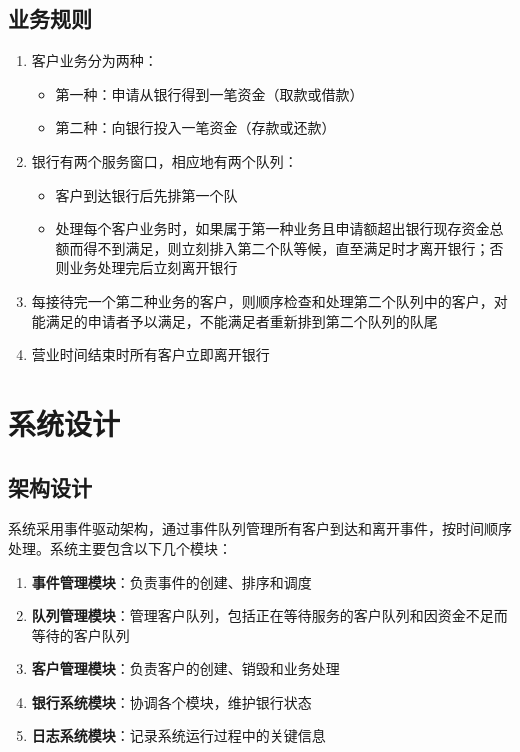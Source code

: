\documentclass[12pt,a4paper]{article}
\begin{document}
\subsection{业务规则}
\begin{enumerate}
\item 客户业务分为两种：
  \begin{itemize}
  \item 第一种：申请从银行得到一笔资金（取款或借款）
  \item 第二种：向银行投入一笔资金（存款或还款）
  \end{itemize}
  
\item 银行有两个服务窗口，相应地有两个队列：
  \begin{itemize}
  \item 客户到达银行后先排第一个队
  \item 处理每个客户业务时，如果属于第一种业务且申请额超出银行现存资金总额而得不到满足，则立刻排入第二个队等候，直至满足时才离开银行；否则业务处理完后立刻离开银行
  \end{itemize}
  
\item 每接待完一个第二种业务的客户，则顺序检查和处理第二个队列中的客户，对能满足的申请者予以满足，不能满足者重新排到第二个队列的队尾

\item 营业时间结束时所有客户立即离开银行
\end{enumerate}

\section{系统设计}
\subsection{架构设计}
系统采用事件驱动架构，通过事件队列管理所有客户到达和离开事件，按时间顺序处理。系统主要包含以下几个模块：

\begin{enumerate}
\item \textbf{事件管理模块}：负责事件的创建、排序和调度
\item \textbf{队列管理模块}：管理客户队列，包括正在等待服务的客户队列和因资金不足而等待的客户队列
\item \textbf{客户管理模块}：负责客户的创建、销毁和业务处理
\item \textbf{银行系统模块}：协调各个模块，维护银行状态
\item \textbf{日志系统模块}：记录系统运行过程中的关键信息
\end{enumerate}
\end{document}
